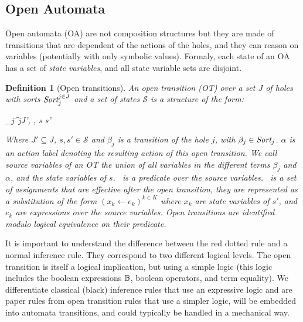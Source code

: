 \documentclass{lmcs}
\newcommand{\TODO}[1]{\textcolor{red}{\textbf{[TODO:#1]}}}
\newtheorem{definition}{Definition}
\begin{document}
\subsection{Open Automata}
 Open automata (OA) are not composition structures but they are made of transitions that are dependent of the actions of the holes, and they can reason on variables (potentially with only symbolic values). Formaly, each state of an OA has a set of \emph{state variables}, and all state variable sets are disjoint.
\begin{definition}[Open transitions]\label{def:OT}
	\label{def:OpenTransitions}
	An \emph{open transition} (OT) over a
	set $J$ of holes with sorts $\Sort_j^{j\in J}$ and a set of states $\mathcal{S}$ is 
	a structure of the form:	
	\begin{mathpar}
	\openrule
	{	\beta_j^{j\in J'}, \Pred, \Post}
	{s \OTarrow {\alpha}s'}
	\end{mathpar}
	Where $J'\subseteq J$, $s, s'\in\mathcal{S}$ and $\beta_j$
        is a transition of the hole $j$, with $\beta_j\in\Sort_j$. $\alpha$ is an action 
        label denoting the resulting action of this open transition.
        We call \emph{source variables} of an OT the union of all variables
        in the different terms
        $\beta_j$ and $\alpha$, and the state variables of $s$.
        \Pred\ is a predicate over the source variables. \Post\ is a set of 
	assignments that are effective \emph{after the open transition}, they are
        represented as a substitution of the form $({x_k\gets e_k})^{k\in K}$ 
	where $x_k$ are state variables of $s'$, and $e_k$ are expressions
        over the source variables. Open transitions are identified
        modulo logical equivalence on their predicate. 
\end{definition}

It is important to understand the difference between the red dotted rule and a normal 
inference rule. They correspond to two different logical levels.
 The open transition is itself a logical implication, but using a simple logic (this logic includes the boolean expressions $\mathbb{B}$, boolean operators, and term equality). We differentiate classical (black) inference rules that use 
 an expressive logic and are paper rules from open transition rules that use a simpler 
 logic, 
 will be embedded into automata transitions, and could typically be handled in a 
 mechanical way.
\end{document}
